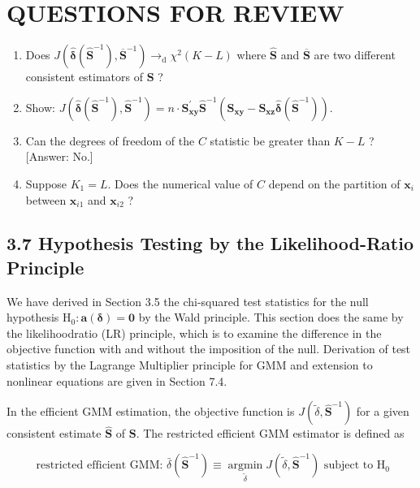 \documentclass[10pt]{article}
\begin{document}
\section*{QUESTIONS FOR REVIEW}
\begin{enumerate}
  \item Does $J\left(\hat{\boldsymbol{\delta}}\left(\widehat{\mathbf{S}}^{-1}\right), \overline{\mathbf{S}}^{-1}\right) \rightarrow_{\mathrm{d}} \chi^{2}(K-L)$ where $\widehat{\mathbf{S}}$ and $\overline{\mathbf{S}}$ are two different consistent estimators of $\mathbf{S}$ ?
  \item Show: $J\left(\hat{\boldsymbol{\delta}}\left(\widehat{\mathbf{S}}^{-1}\right), \widehat{\mathbf{S}}^{-1}\right)=n \cdot \mathbf{S}_{\mathbf{x y}}^{\prime} \widehat{\mathbf{S}}^{-1}\left(\mathbf{S}_{\mathbf{x y}}-\mathbf{S}_{\mathbf{x z}} \hat{\boldsymbol{\delta}}\left(\widehat{\mathbf{S}}^{-1}\right)\right)$.
  \item Can the degrees of freedom of the $C$ statistic be greater than $K-L$ ? [Answer: No.]
  \item Suppose $K_{1}=L$. Does the numerical value of $C$ depend on the partition of $\mathbf{x}_{i}$ between $\mathbf{x}_{i 1}$ and $\mathbf{x}_{i 2}$ ?
\end{enumerate}

\subsection*{3.7 Hypothesis Testing by the Likelihood-Ratio Principle}
We have derived in Section 3.5 the chi-squared test statistics for the null hypothesis $\mathrm{H}_{0}: \mathbf{a}(\boldsymbol{\delta})=\mathbf{0}$ by the Wald principle. This section does the same by the likelihoodratio (LR) principle, which is to examine the difference in the objective function with and without the imposition of the null. Derivation of test statistics by the Lagrange Multiplier principle for GMM and extension to nonlinear equations are given in Section 7.4.

In the efficient GMM estimation, the objective function is $J\left(\tilde{\delta}, \widehat{\mathbf{S}}^{-1}\right)$ for a given consistent estimate $\widehat{\mathbf{S}}$ of $\mathbf{S}$. The restricted efficient GMM estimator is defined as


\begin{equation*}
\text { restricted efficient GMM: } \bar{\delta}\left(\widehat{\mathbf{S}}^{-1}\right) \equiv \underset{\tilde{\delta}}{\operatorname{argmin}} J\left(\tilde{\delta}, \widehat{\mathbf{S}}^{-1}\right) \text { subject to } \mathrm{H}_{0} \tag{3.7.1}
\end{equation*}
\end{document}
